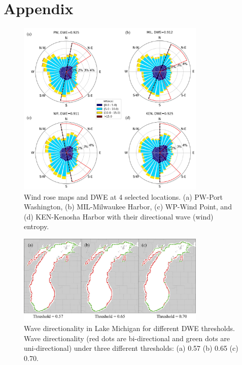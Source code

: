 

\chapter{Appendix}
\label{Appendix}


\begin{figure}[htbp]
  \centering
  \includegraphics[width=0.8\textwidth]{appendix/resources/figure3-1a.jpg}
  \caption{Wind rose maps and DWE at 4 selected locations. (a) PW-Port Washington, (b) MIL-Milwaukee Harbor, (c) WP-Wind Point, and (d) KEN-Kenosha Harbor with their directional wave (wind) entropy.}
  \label{fig:fig3.1a}
\end{figure}

\begin{figure}[htbp]
  \centering
  \includegraphics[width=0.8\textwidth]{appendix/resources/figure3-2a.jpg}
  \caption{Wave directionality in Lake Michigan for different DWE thresholds. Wave directionality (red dots are bi-directional and green dots are uni-directional) under three different thresholds: (a) 0.57 (b) 0.65 (c) 0.70.}
  \label{fig:fig3.2a}
\end{figure}

